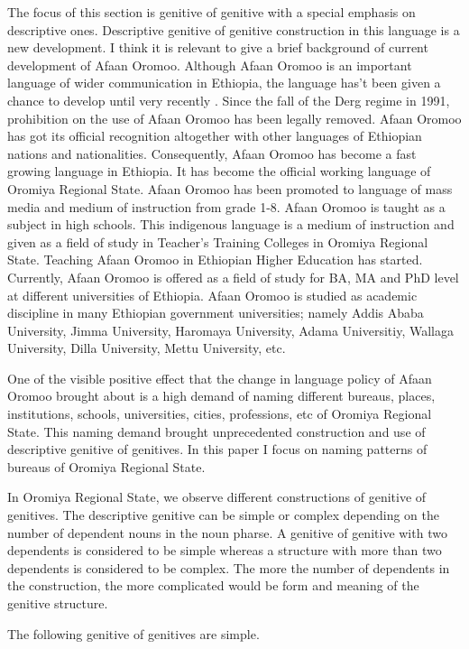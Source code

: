 \documentclass[11pt,a4paper]{article}
\begin{document}
	
	The focus of this section is genitive of genitive with a special emphasis on descriptive ones. Descriptive genitive of genitive construction in this language is a new development. I think it is relevant to give a brief background of current development of Afaan Oromoo. Although Afaan Oromoo is an important language of wider communication in Ethiopia, the language has’t been given 
	a chance to develop until very recently \cite[326]{bulcha1997politics}. Since the fall of the Derg regime in 1991, prohibition on the use of Afaan Oromoo has been 
	legally removed. Afaan Oromoo has got its official recognition altogether with other languages of Ethiopian nations and nationalities.  Consequently, 
	Afaan Oromoo has become a fast growing language in Ethiopia. It has become the official working language of Oromiya Regional State. Afaan Oromoo has been 
	promoted to language of mass media and medium of instruction from grade 1-8. Afaan Oromoo is taught as a subject in high schools. This indigenous language 
	is a medium of instruction and given as a field of study in Teacher’s Training Colleges in Oromiya Regional State. Teaching Afaan 	Oromoo in Ethiopian Higher Education has started. Currently, Afaan Oromoo is offered as a field of study for BA, MA and PhD level at different 
	universities of Ethiopia. Afaan Oromoo is studied as academic discipline in many Ethiopian government universities; namely Addis Ababa University, 
	Jimma University, Haromaya University, Adama Universitiy, Wallaga University, Dilla University, Mettu University, etc. 
	
	One of the visible positive effect that the change in language policy of Afaan Oromoo brought about is a high demand of naming different bureaus, places, institutions, schools, universities, cities, professions, etc of Oromiya Regional State. This naming demand brought unprecedented construction and use of  descriptive genitive of genitives. In this paper I focus on naming patterns of bureaus of Oromiya Regional State. 
	
	In Oromiya Regional State, we observe different constructions of genitive of genitives. The descriptive genitive can be simple or complex depending on the number of dependent nouns in the noun pharse. A genitive of genitive with two dependents is considered to be simple whereas a structure with more than two dependents is considered to be complex. The more the number of dependents in the construction, the more complicated would be form and meaning of the genitive structure. 
	
	The following genitive of genitives are simple.
	
\end{document}
